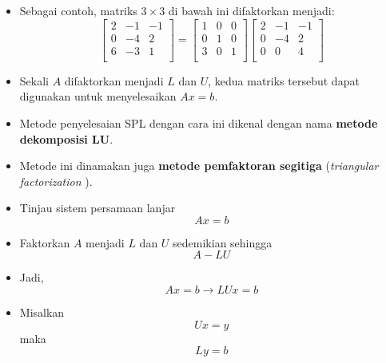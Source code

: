 \documentclass[pdflatex,compress,mathserif]{beamer}
\begin{document}
\begin{frame}
	\begin{itemize}
		\item Sebagai contoh, matriks $3 \times 3$ di bawah ini difaktorkan menjadi:
		\[
		\begin{bmatrix}
			2 & -1 & -1 \\
			0 & -4 & 2 \\
			6 & -3 & 1 \\
		\end{bmatrix}
		=
		\begin{bmatrix}
			1 & 0 & 0 \\
			0 & 1 & 0 \\
			3 & 0 & 1 \\
		\end{bmatrix}
		\begin{bmatrix}
			2 & -1 & -1 \\
			0 & -4 & 2 \\
			0 & 0 & 4 \\
		\end{bmatrix}
		\]
		\item Sekali $ A $ difaktorkan menjadi $ L $ dan $ U $, kedua matriks tersebut dapat digunakan untuk menyelesaikan $ Ax = b $.
		\item Metode penyelesaian SPL dengan cara ini dikenal dengan nama \textbf{metode dekomposisi LU}.
		\item Metode ini dinamakan juga \textbf{metode pemfaktoran segitiga} (\textit{triangular factorization }).
	\end{itemize}
\end{frame}

\begin{frame}
	\begin{itemize}
		\item Tinjau sistem persamaan lanjar \[Ax = b\]
		\item Faktorkan $ A $ menjadi $ L $ dan $ U $ sedemikian sehingga \[ A - LU \]
		\item Jadi, \[Ax = b \rightarrow LUx = b\]
		\item Misalkan \[ Ux = y \]
		maka \[ Ly = b \]
	\end{itemize}
\end{frame}
\end{document}

